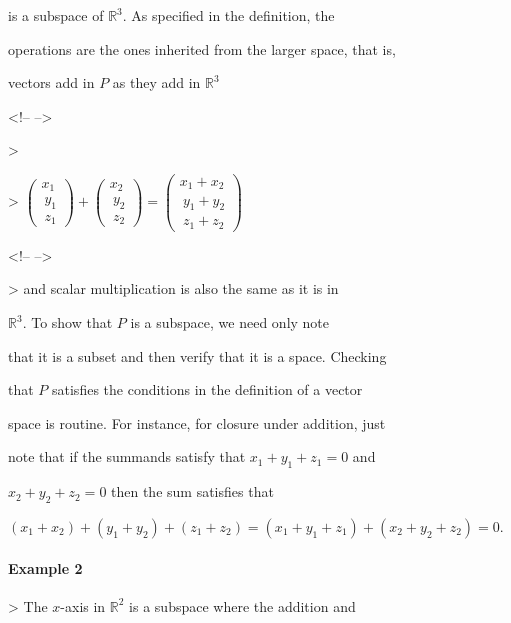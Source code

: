     is a subspace of $\mathbb{R}^3$. As specified in the definition, the

    operations are the ones inherited from the larger space, that is,

    vectors add in $P$ as they add in $\mathbb{R}^3$



<!-- -->



>   



    >   $\begin{pmatrix} x_1 \\\     y_1 \\\     z_1 \end{pmatrix}+\begin{pmatrix} x_2 \\\     y_2 \\\     z_2 \end{pmatrix}

        =\begin{pmatrix} x_1+x_2 \\\         y_1+y_2 \\\         z_1+z_2 \end{pmatrix}$



<!-- -->



>   and scalar multiplication is also the same as it is in

    $\mathbb{R}^3$. To show that $P$ is a subspace, we need only note

    that it is a subset and then verify that it is a space. Checking

    that $P$ satisfies the conditions in the definition of a vector

    space is routine. For instance, for closure under addition, just

    note that if the summands satisfy that $x_1+y_1+z_1=0$ and

    $x_2+y_2+z_2=0$ then the sum satisfies that

    $(x_1+x_2)+(y_1+y_2)+(z_1+z_2)=(x_1+y_1+z_1)+(x_2+y_2+z_2)=0$.



\paragraph{Example 2}



>   The $x$-axis in $\mathbb{R}^2$ is a subspace where the addition and

